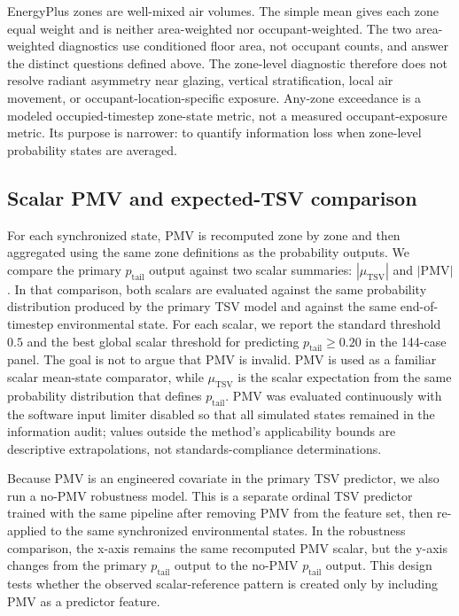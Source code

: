 EnergyPlus zones are well-mixed air volumes. The simple mean gives each zone equal weight and is neither area-weighted nor occupant-weighted. The two area-weighted diagnostics use conditioned floor area, not occupant counts, and answer the distinct questions defined above. The zone-level diagnostic therefore does not resolve radiant asymmetry near glazing, vertical stratification, local air movement, or occupant-location-specific exposure. Any-zone exceedance is a modeled occupied-timestep zone-state metric, not a measured occupant-exposure metric. Its purpose is narrower: to quantify information loss when zone-level probability states are averaged.

\subsection{Scalar PMV and expected-TSV comparison}

For each synchronized state, PMV is recomputed zone by zone and then aggregated using the same zone definitions as the probability outputs. We compare the primary $p_{\mathrm{tail}}$ output against two scalar summaries: $|\mu_{\mathrm{TSV}}|$ and $|\mathrm{PMV}|$. In that comparison, both scalars are evaluated against the same probability distribution produced by the primary TSV model and against the same end-of-timestep environmental state. For each scalar, we report the standard threshold $0.5$ and the best global scalar threshold for predicting $p_{\mathrm{tail}}\ge0.20$ in the 144-case panel. The goal is not to argue that PMV is invalid. PMV is used as a familiar scalar mean-state comparator, while $\mu_{\mathrm{TSV}}$ is the scalar expectation from the same probability distribution that defines $p_{\mathrm{tail}}$. PMV was evaluated continuously with the software input limiter disabled so that all simulated states remained in the information audit; values outside the method's applicability bounds are descriptive extrapolations, not standards-compliance determinations.

Because PMV is an engineered covariate in the primary TSV predictor, we also run a no-PMV robustness model. This is a separate ordinal TSV predictor trained with the same pipeline after removing PMV from the feature set, then re-applied to the same synchronized environmental states. In the robustness comparison, the x-axis remains the same recomputed PMV scalar, but the y-axis changes from the primary $p_{\mathrm{tail}}$ output to the no-PMV $p_{\mathrm{tail}}$ output. This design tests whether the observed scalar-reference pattern is created only by including PMV as a predictor feature.

